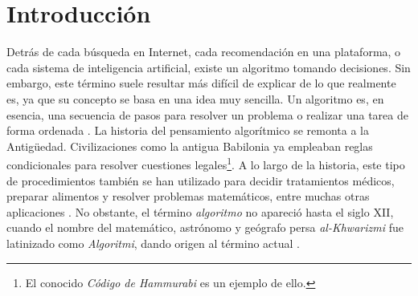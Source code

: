 % 
% 
% 
% 
% 
% 
% 
% 

\chapter{Introducción}
\label{cha:introduccion}

Detrás de cada búsqueda en Internet, cada recomendación en una plataforma, o cada sistema de inteligencia artificial, existe un 
algoritmo tomando decisiones. Sin embargo, este término suele resultar más difícil de explicar de lo que realmente es, ya que su
concepto se basa en una idea muy sencilla. Un algoritmo es, en esencia, una secuencia de pasos para resolver un problema o 
realizar una tarea de forma ordenada \cite{acevedo}. La historia del pensamiento algorítmico se remonta a la Antigüedad.
Civilizaciones como la antigua Babilonia ya empleaban reglas condicionales para resolver cuestiones legales\footnote{El conocido 
\textit{Código de Hammurabi} \cite{hammurabi} es un ejemplo de ello.}. A lo largo de la historia, este tipo de procedimientos 
también se han utilizado para decidir tratamientos médicos, preparar alimentos y resolver problemas matemáticos, entre muchas 
otras aplicaciones \cite{chabert2012}. No obstante, el término \textit{algoritmo} no apareció hasta el siglo XII, cuando el 
nombre del matemático, astrónomo y geógrafo persa \textit{al-Khwarizmi} fue latinizado como \textit{Algoritmi}, dando origen al
término actual \cite{alkhwarizmi2017}.

